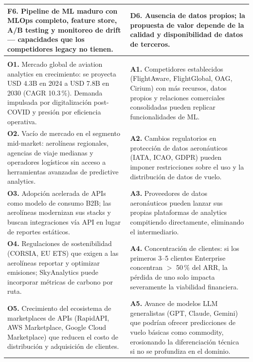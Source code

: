 ﻿\documentclass[11pt, letterpaper]{article}
\begin{document}
\begin{table}[H]
\begin{tabularx}{\linewidth}{>{\raggedright\arraybackslash}p{6.5cm} >{\raggedright\arraybackslash}X}
\textbf{F6.} Pipeline de ML maduro con MLOps completo, feature store, A/B testing y monitoreo de drift — capacidades que los competidores legacy no tienen. & \textbf{D6.} Ausencia de datos propios; la propuesta de valor depende de la calidad y disponibilidad de datos de terceros. \\

\midrule

\multicolumn{1}{>{\raggedright\arraybackslash}p{6.5cm}}{\textbf{Oportunidades (Externas)}} &

\multicolumn{1}{>{\raggedright\arraybackslash}X}{\textbf{Amenazas (Externas)}} \\

\midrule

\textbf{O1.} Mercado global de aviation analytics en crecimiento: se proyecta USD 4.3B en 2024 a USD 7.8B en 2030 (CAGR 10.3\,\%). Demanda impulsada por digitalización post-COVID y presión por eficiencia operativa. & \textbf{A1.} Competidores establecidos (FlightAware, FlightGlobal, OAG, Cirium) con más recursos, datos propios y relaciones comerciales consolidadas pueden replicar funcionalidades de ML. \\

\textbf{O2.} Vacío de mercado en el segmento mid-market: aerolíneas regionales, agencias de viaje medianas y operadores logísticos sin acceso a herramientas avanzadas de predictive analytics. & \textbf{A2.} Cambios regulatorios en protección de datos aeronáuticos (IATA, ICAO, GDPR) pueden imponer restricciones sobre el uso y la distribución de datos de vuelo. \\

\textbf{O3.} Adopción acelerada de APIs como modelo de consumo B2B; las aerolíneas modernizan sus stacks y buscan integraciones vía API en lugar de reportes estáticos. & \textbf{A3.} Proveedores de datos aeronáuticos pueden lanzar sus propias plataformas de analytics compitiendo directamente, eliminando el intermediario. \\

\textbf{O4.} Regulaciones de sostenibilidad (CORSIA, EU ETS) que exigen a las aerolíneas reportar y optimizar emisiones; SkyAnalytics puede incorporar métricas de carbono por ruta. & \textbf{A4.} Concentración de clientes: si los primeros 3--5 clientes Enterprise concentran $>$ 50\,\% del ARR, la pérdida de uno solo impacta severamente la viabilidad financiera. \\

\textbf{O5.} Crecimiento del ecosistema de marketplaces de APIs (RapidAPI, AWS Marketplace, Google Cloud Marketplace) que reducen el costo de distribución y adquisición de clientes. & \textbf{A5.} Avance de modelos LLM generalistas (GPT, Claude, Gemini) que podrían ofrecer predicciones de vuelo básicas como commodity, erosionando la diferenciación técnica si no se profundiza en el dominio. \\


\end{tabularx}
\end{table}
\end{document}
